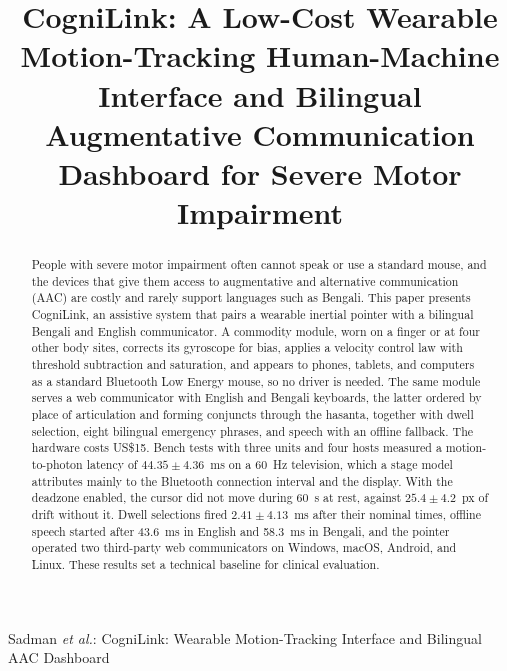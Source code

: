 \documentclass[journal]{IEEEtran}
\begin{document}

\title{CogniLink: A Low-Cost Wearable Motion-Tracking Human-Machine Interface and Bilingual Augmentative Communication Dashboard for Severe Motor Impairment}



%
{Sadman \MakeLowercase{\textit{et al.}}: CogniLink: Wearable Motion-Tracking Interface and Bilingual AAC Dashboard}

\maketitle

\begin{abstract}
People with severe motor impairment often cannot speak or use a standard mouse, and the devices that give them access to augmentative and alternative communication (AAC) are costly and rarely support languages such as Bengali. This paper presents CogniLink, an assistive system that pairs a wearable inertial pointer with a bilingual Bengali and English communicator. A commodity module, worn on a finger or at four other body sites, corrects its gyroscope for bias, applies a velocity control law with threshold subtraction and saturation, and appears to phones, tablets, and computers as a standard Bluetooth Low Energy mouse, so no driver is needed. The same module serves a web communicator with English and Bengali keyboards, the latter ordered by place of articulation and forming conjuncts through the hasanta, together with dwell selection, eight bilingual emergency phrases, and speech with an offline fallback. The hardware costs US\$15. Bench tests with three units and four hosts measured a motion-to-photon latency of $44.35\pm4.36$~ms on a 60~Hz television, which a stage model attributes mainly to the Bluetooth connection interval and the display. With the deadzone enabled, the cursor did not move during 60~s at rest, against $25.4\pm4.2$~px of drift without it. Dwell selections fired $2.41\pm4.13$~ms after their nominal times, offline speech started after 43.6~ms in English and 58.3~ms in Bengali, and the pointer operated two third-party web communicators on Windows, macOS, Android, and Linux. These results set a technical baseline for clinical evaluation.
\end{abstract}
\end{document}
